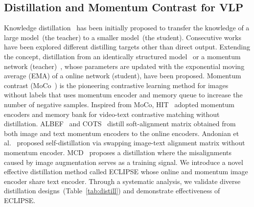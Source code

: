 \subsection{Distillation and Momentum Contrast for VLP}
Knowledge distillation~\cite{hinton2015distilling} has been initially proposed to transfer the knowledge of a large model~(the teacher) to a smaller model~(the student).
Consecutive works~\cite{Romero2015FitNet,Park2019RelKD} have been explored different distilling targets other than direct output.
Extending the concept, distillation from an identically structured model~\cite{Furlanello2018BornAgain,Bagherinezhad2018LabelRefinery} or a momentum network (teacher)~\cite{Tarvainen2017meanteacher,he2020moco,grill2020bootstrap,caron2021emerging}, whose parameters are updated with the exponential moving average (EMA) of a online network (student), have been proposed.
Momentum contrast (MoCo~\cite{he2020moco}) is the pioneering contrastive learning method for images without labels that uses momentum encoder and memory queue to increase the number of negative samples. 
Inspired from MoCo, HIT~\cite{Liu2021HiT} adopted momentum encoders and memory bank for video-text contrastive matching without distillation.
ALBEF~\cite{li2021align} and COTS~\cite{Lu2022COTS} distill soft-alignment matrix obtained from both image and text momentum encoders to the online encoders.
Andonian et al.~\cite{Andonian2022robust} proposed self-distillation via swapping image-text alignment matrix without momentum encoder.
MCD~\cite{kim2023misalign} proposes a distillation where the misalignments caused by image augmentation serves as a training signal.
We introduce a novel effective distillation method called ECLIPSE whose online and momentum image encoder share text encoder.
Through a systematic analysis, we validate diverse distillation designs~(Table~\ref{tab:distill}) and demonstrate effectiveness of ECLIPSE.